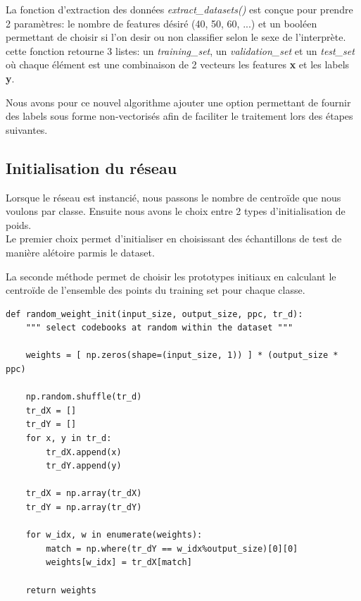 \documentclass[11pt]{article}
\begin{document}
La fonction d'extraction des donn\'ees {\em extract\_datasets()}
est con\c{c}ue pour prendre 2 param\`etres: le nombre de features d\'esir\'e
(40, 50, 60, ...) et un bool\'een permettant de choisir si l'on desir ou non
classifier selon le sexe de l'interpr\`ete. cette fonction retourne 3 listes:
un {\em training\_set}, un {\em validation\_set} et un {\em test\_set} o\`u
chaque \'el\'ement est une combinaison de 2 vecteurs les features {\bf x} et
les labels {\bf y}.

Nous avons pour ce nouvel algorithme ajouter une option permettant de fournir
des labels sous forme non-vectoris\'es afin de faciliter le traitement lors des
\'etapes suivantes.



\subsection{Initialisation du r\'eseau}
Lorsque le r\'eseau est instanci\'e, nous passons le nombre de centro{\"i}de que
nous voulons par classe.
Ensuite nous avons le choix entre 2 types d'initialisation de poids.\\
Le premier choix permet d'initialiser en choisissant des \'echantillons de test
de mani\`ere al\'etoire parmis le dataset.

La seconde m\'ethode permet de choisir les prototypes initiaux en calculant le
centro\"ide de l'ensemble des points du training set pour chaque classe.

\begin{lstlisting}
def random_weight_init(input_size, output_size, ppc, tr_d):
    """ select codebooks at random within the dataset """

    weights = [ np.zeros(shape=(input_size, 1)) ] * (output_size * ppc)

    np.random.shuffle(tr_d)
    tr_dX = []
    tr_dY = []
    for x, y in tr_d:
        tr_dX.append(x)
        tr_dY.append(y)

    tr_dX = np.array(tr_dX)
    tr_dY = np.array(tr_dY)

    for w_idx, w in enumerate(weights):
        match = np.where(tr_dY == w_idx%output_size)[0][0]
        weights[w_idx] = tr_dX[match]

    return weights
\end{lstlisting}
\end{document}

